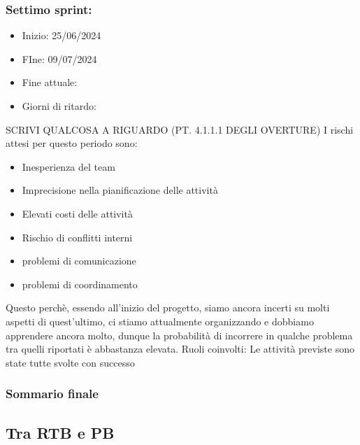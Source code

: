     \subsubsection{Settimo sprint:}
    \begin{itemize}
        \item Inizio: 25/06/2024
        \item FIne: 09/07/2024
        \item Fine attuale:
        \item Giorni di ritardo:
    \end{itemize}
    SCRIVI QUALCOSA A RIGUARDO (PT. 4.1.1.1 DEGLI OVERTURE)
    I rischi attesi per questo periodo sono:
    \begin{itemize}
        \item Inesperienza del team
        \item Imprecisione nella pianificazione delle attività
        \item Elevati costi delle attività
        \item Rischio di conflitti interni 
        \item problemi di comunicazione
        \item problemi di coordinamento
    \end{itemize}
    Questo perchè, essendo all’inizio del progetto, siamo ancora incerti su molti aspetti di quest’ultimo, ci stiamo attualmente organizzando e dobbiamo apprendere ancora molto, dunque la probabilità di incorrere in qualche problema tra quelli riportati è abbastanza elevata.
    Ruoli coinvolti: 
    Le attività previste sono state tutte svolte con successo

    \subsubsection{Sommario finale}

    \subsection{Tra RTB e PB}
